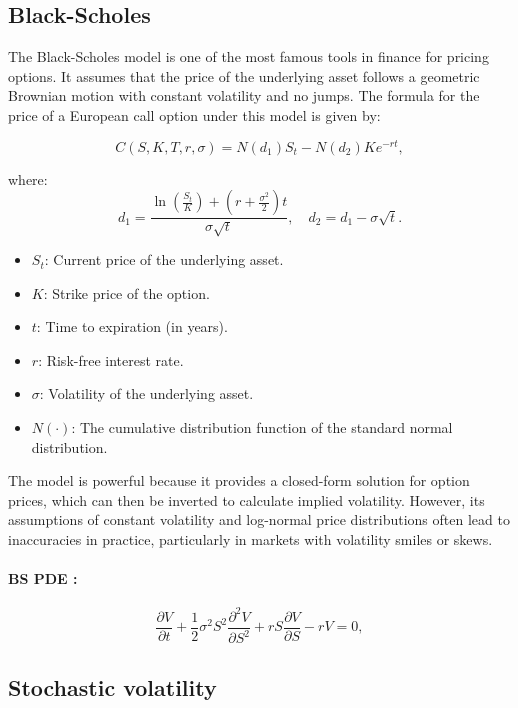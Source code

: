 \documentclass[letterpaper,11pt]{article}
\begin{document}
\subsection{Black-Scholes}
The Black-Scholes model is one of the most famous tools in finance for pricing options. It assumes that the price of the underlying asset follows a geometric Brownian motion with constant volatility and no jumps. The formula for the price of a European call option under this model is given by:


\[
C(S, K, T, r, \sigma) = N(d_1) S_t - N(d_2) K e^{-rt} ,
\]

where:
\[
d_1 = \frac{\ln(\frac{S_t}{K}) + (r + \frac{\sigma^2}{2})t}{\sigma \sqrt{t}}, \quad d_2 = d_1 - \sigma \sqrt{t}.
\]



\begin{itemize}
    \item \( S_t \): Current price of the underlying asset.
    \item \( K \): Strike price of the option.
    \item \( t \): Time to expiration (in years).
    \item \( r \): Risk-free interest rate.
    \item \( \sigma \): Volatility of the underlying asset.
    \item \( N(\cdot) \): The cumulative distribution function of the standard normal distribution.
\end{itemize}

The model is powerful because it provides a closed-form solution for option prices, which can then be inverted to calculate implied volatility. However, its assumptions of constant volatility and log-normal price distributions often lead to inaccuracies in practice, particularly in markets with volatility smiles or skews.\\

\paragraph{BS PDE : }
\[
\frac{\partial V}{\partial t} + \frac{1}{2} \sigma^2 S^2 \frac{\partial^2 V}{\partial S^2} + r S \frac{\partial V}{\partial S} - r V = 0,
\]




\subsection{Stochastic volatility}
\end{document}
